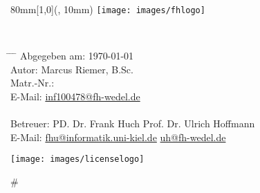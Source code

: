 \begin{titlepage}
  \vspace*{30ex}
  \begin{textblock*}{80mm}[1,0](\paperwidth, 10mm)
    \centering
    \texttt{[image: images/fhlogo]}
  \end{textblock*}
  \begin{center}
    \sffamily{}
    {\huge\bfseries\doctitle} \\[4ex]
    {\Large\docsubtitle}
  \end{center}
  \vspace*{40ex}
  \begin{tabbing}
    \hspace{8em} \= \hspace{14em} \= \hspace{8em} \= \kill
    Abgegeben am: \> \today{} \\[5ex]
    Autor: \> Marcus Riemer, B.Sc. \\
    Matr.-Nr.:  \\
    E-Mail: \> \href{mailto:inf100478@fh-wedel.de}{inf100478@fh-wedel.de} \\

    \\
    Betreuer: \> PD. Dr. Frank Huch  \> Prof. Dr. Ulrich Hoffmann \\
    E-Mail: \> \href{mailto:fhu@informatik.uni-kiel.de}{fhu@informatik.uni-kiel.de} \> \href{mailto:uh@fh-wedel.de}{uh@fh-wedel.de}
  \end{tabbing}
  \vfill
  \centering \texttt{[image: images/licenselogo]}
\end{titlepage}#

